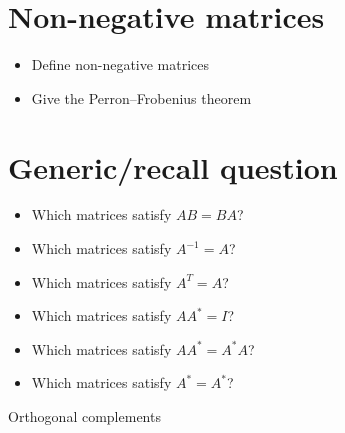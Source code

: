 \documentclass[a4paper]{article}
\begin{document}
\section{Non-negative matrices}

\begin{itemize}
  \item Define non-negative matrices
  \item Give the Perron--Frobenius theorem
\end{itemize}

\section{Generic/recall question}

\begin{itemize}
  \item Which matrices satisfy $A B = B A$?
  \item Which matrices satisfy $A^{-1} = A$?
  \item Which matrices satisfy $A^{T} = A$?
  \item Which matrices satisfy $AA^* = I$?
  \item Which matrices satisfy $AA^* = A^*A$?
  \item Which matrices satisfy $A^* = A^*$?
\end{itemize}


Orthogonal complements
\end{document}
